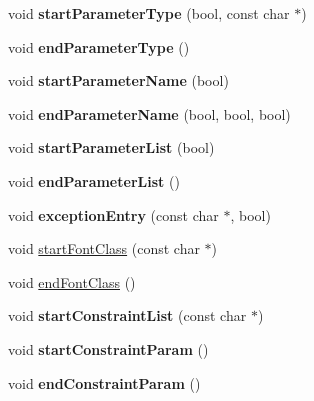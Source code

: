\begin{DoxyCompactItemize}
void {\bfseries start\+Parameter\+Type} (bool, const char $\ast$)
\item 
\mbox{\label{class_man_generator_abc642fb37525e494dc01a2b9450fa516}} 
void {\bfseries end\+Parameter\+Type} ()
\item 
\mbox{\label{class_man_generator_af739d0bdac7bc933cd49aac0c91733fb}} 
void {\bfseries start\+Parameter\+Name} (bool)
\item 
\mbox{\label{class_man_generator_a9b26c28be8f8e51f9d8c2d3bcf5af505}} 
void {\bfseries end\+Parameter\+Name} (bool, bool, bool)
\item 
\mbox{\label{class_man_generator_ac6c153743231aa2e67b39ce527869a8d}} 
void {\bfseries start\+Parameter\+List} (bool)
\item 
\mbox{\label{class_man_generator_add87f53c9277adfe77e311096b616d8d}} 
void {\bfseries end\+Parameter\+List} ()
\item 
\mbox{\label{class_man_generator_ae747187a714e7c5465432a9171388804}} 
void {\bfseries exception\+Entry} (const char $\ast$, bool)
\item 
void \mbox{\hyperlink{class_man_generator_a4bafda26799458d289c507fad6690de9}{start\+Font\+Class}} (const char $\ast$)
\item 
void \mbox{\hyperlink{class_man_generator_a35a79c6fc4ee7bd9eeadb74181e368d1}{end\+Font\+Class}} ()
\item 
\mbox{\label{class_man_generator_a0f2e73868294b926079a00988aa11723}} 
void {\bfseries start\+Constraint\+List} (const char $\ast$)
\item 
\mbox{\label{class_man_generator_a0093d745b94f89f5812c48dbdce045e7}} 
void {\bfseries start\+Constraint\+Param} ()
\item 
\mbox{\label{class_man_generator_a2269ac68c06f0006836ee3b271384cbb}} 
void {\bfseries end\+Constraint\+Param} ()
\item 
\mbox{\label{class_man_generator_a626fe47f183f5e46f31a51dc2f18c26f}} 

\end{DoxyCompactItemize}
